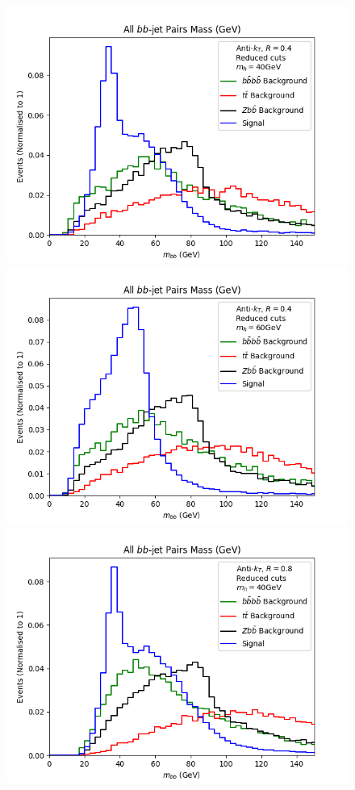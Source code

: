 \documentclass[12pt]{article}
\begin{document}
\begin{figure}[t!]
\hspace*{-0.25cm}
    \includegraphics[scale=0.5]{plots/Background/bb_mass_all_pairs_40gev_AK4.png}
    \includegraphics[scale=0.5]{plots/Background/bb_mass_all_pairs_60gev_AK4.png}
    \includegraphics[scale=0.5]{plots/Background/bb_mass_all_pairs_40gev_AK8.png}

\end{figure}
\end{document}
